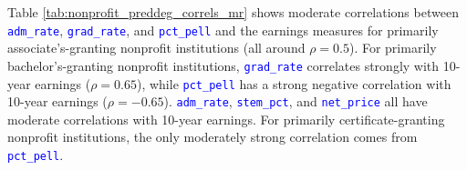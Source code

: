\documentclass[12pt]{article}
\numberwithin{equation}{section}
\newcommand{\Varnm}[1]{\texttt{\textcolor{Blue}{#1}}}
\begin{document}
\begin{table}[ht!]
\caption{Correlations by primary degree granted (\Varnm{preddeg}) in nonprofit institutions}
\label{tab:nonprofit_preddeg_correls_mr}
\centering
{}
\end{table}

Table \ref{tab:nonprofit_preddeg_correls_mr} shows moderate correlations between \Varnm{adm\_rate}, \Varnm{grad\_rate}, and \Varnm{pct\_pell} and the earnings measures for primarily associate's-granting nonprofit institutions (all around $\rho = 0.5$). For primarily bachelor's-granting nonprofit institutions, \Varnm{grad\_rate} correlates strongly with 10-year earnings ($\rho = 0.65$), while \Varnm{pct\_pell} has a strong negative correlation with 10-year earnings ($\rho = -0.65$). \Varnm{adm\_rate}, \Varnm{stem\_pct}, and \Varnm{net\_price} all have moderate correlations with 10-year earnings. For primarily certificate-granting nonprofit institutions, the only moderately strong correlation comes from \Varnm{pct\_pell}.
\end{document}

